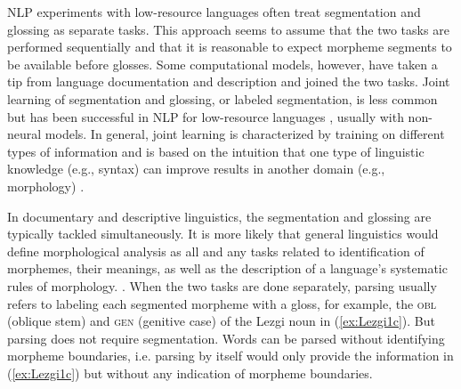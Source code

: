 NLP experiments with low-resource languages often treat segmentation and glossing as separate tasks. This approach seems to assume that the two tasks are performed sequentially and that it is reasonable to expect morpheme segments to be available before glosses. 
Some computational models, however, have taken a tip from language documentation and description and joined the two tasks.
Joint learning of segmentation and glossing, or labeled segmentation, is less common but has been successful in NLP for low-resource languages \citep{cotterell_labeled_2015,moeller_automatic_2018}, usually with non-neural models. In general, joint learning is characterized by training on different types of information and is based on the intuition that one type of linguistic knowledge (e.g., syntax) can improve results in another domain (e.g., morphology) \citep{goldsmith_computational_2017}. 
 
In documentary and descriptive linguistics, the segmentation and glossing are typically tackled simultaneously. It is more likely that general linguistics would define morphological analysis as all and any tasks related to identification of morphemes, their meanings, as well as the description of a language’s systematic rules of morphology. 
\citep{cotterell_labeled_2015}. When the two tasks are done separately, parsing usually refers to labeling each segmented morpheme with a gloss, for example, the \textsc{obl} (oblique stem) and \textsc{gen} (genitive case) of the Lezgi noun in (\ref{ex:Lezgi1c}). But parsing does not require segmentation. %
Words can be parsed without identifying morpheme boundaries, i.e. parsing by itself would only provide the information in (\ref{ex:Lezgi1c}) but without any indication of morpheme boundaries. %


